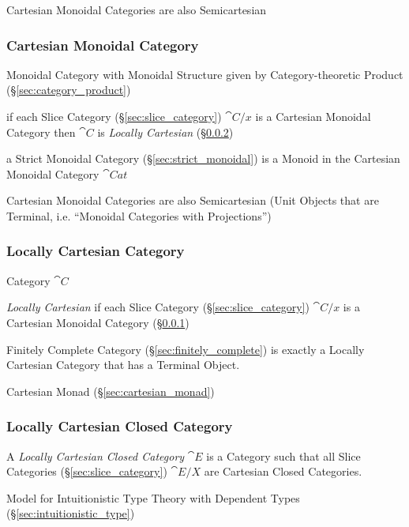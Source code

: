 Cartesian Monoidal Categories are also Semicartesian



\subsubsection{Cartesian Monoidal Category}\label{sec:cartesian_monoidal}

Monoidal Category with Monoidal Structure given by Category-theoretic Product
(\S\ref{sec:category_product})

if each Slice Category (\S\ref{sec:slice_category}) $\cat{C}/x$ is a
Cartesian Monoidal Category then $\cat{C}$ is \emph{Locally Cartesian}
(\S\ref{sec:locally_cartesian})

a Strict Monoidal Category (\S\ref{sec:strict_monoidal}) is a Monoid
in the Cartesian Monoidal Category $\cat{Cat}$

Cartesian Monoidal Categories are also Semicartesian (Unit Objects
that are Terminal, i.e. ``Monoidal Categories with Projections'')



\subsubsection{Locally Cartesian Category}\label{sec:locally_cartesian}

Category $\cat{C}$

\emph{Locally Cartesian} if each Slice Category
(\S\ref{sec:slice_category}) $\cat{C}/x$ is a Cartesian Monoidal
Category (\S\ref{sec:cartesian_monoidal})

Finitely Complete Category (\S\ref{sec:finitely_complete}) is exactly
a Locally Cartesian Category that has a Terminal Object.

Cartesian Monad (\S\ref{sec:cartesian_monad})



\subsubsection{Locally Cartesian Closed Category}
\label{sec:locally_cartesian_closed}

A \emph{Locally Cartesian Closed Category} $\cat{E}$ is a Category
such that all Slice Categories (\S\ref{sec:slice_category})
$\cat{E}/X$ are Cartesian Closed Categories.

Model for Intuitionistic Type Theory with Dependent Types
(\S\ref{sec:intuitionistic_type})

